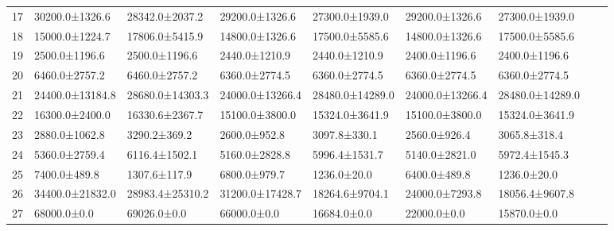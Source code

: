 \begin{tabular}{|r|l|l|l|l|l|l|l|l|}
  17 & 30200.0±1326.6 & 28342.0±2037.2 & 29200.0±1326.6 & 27300.0±1939.0 & 29200.0±1326.6 & 27300.0±1939.0 \\ 
  18 & 15000.0±1224.7 & 17806.0±5415.9 & 14800.0±1326.6 & 17500.0±5585.6 & 14800.0±1326.6 & 17500.0±5585.6 \\ 
  19 & 2500.0±1196.6 & 2500.0±1196.6 & 2440.0±1210.9 & 2440.0±1210.9 & 2400.0±1196.6 & 2400.0±1196.6 \\ 
  20 & 6460.0±2757.2 & 6460.0±2757.2 & 6360.0±2774.5 & 6360.0±2774.5 & 6360.0±2774.5 & 6360.0±2774.5 \\ 
  21 & 24400.0±13184.8 & 28680.0±14303.3 & 24000.0±13266.4 & 28480.0±14289.0 & 24000.0±13266.4 & 28480.0±14289.0 \\ 
  22 & 16300.0±2400.0 & 16330.6±2367.7 & 15100.0±3800.0 & 15324.0±3641.9 & 15100.0±3800.0 & 15324.0±3641.9 \\ 
  23 & 2880.0±1062.8 & 3290.2±369.2 & 2600.0±952.8 & 3097.8±330.1 & 2560.0±926.4 & 3065.8±318.4 \\ 
  24 & 5360.0±2759.4 & 6116.4±1502.1 & 5160.0±2828.8 & 5996.4±1531.7 & 5140.0±2821.0 & 5972.4±1545.3 \\ 
  25 & 7400.0±489.8 & 1307.6±117.9 & 6800.0±979.7 & 1236.0±20.0 & 6400.0±489.8 & 1236.0±20.0 \\ 
  26 & 34400.0±21832.0 & 28983.4±25310.2 & 31200.0±17428.7 & 18264.6±9704.1 & 24000.0±7293.8 & 18056.4±9607.8 \\ 
  27 & 68000.0±0.0 & 69026.0±0.0 & 66000.0±0.0 & 16684.0±0.0 & 22000.0±0.0 & 15870.0±0.0 \\ 
\end{tabular}

